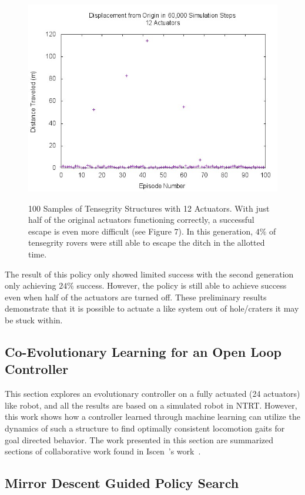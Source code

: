\begin{figure}[thpb]
\centering
{\includegraphics[width=0.8\linewidth]{tex/ARMS_2015/Pictures/dists50.jpg}} 
\caption{100 Samples of Tensegrity Structures with 12 Actuators. With just half of the original actuators functioning correctly, a successful escape is even more difficult (see Figure $7$).
In this generation, $4\%$ of tensegrity rovers were still able to escape the ditch in the allotted time.}
\label{robust12scatter}
\end{figure}

The result of this policy only showed limited success with the second generation only achieving \(24\%\) success.
However, the policy is still able to achieve success even when half of the actuators are turned off.
These preliminary results demonstrate that it is possible to actuate a \SB{} like system out of hole/craters it may be stuck within.

\subsection{Co-Evolutionary Learning for an Open Loop Controller}
\label{sec:openLoopControl}
This section explores an evolutionary controller on a fully actuated (24 actuators) \SB{} like robot, and all the results are based on a simulated robot in NTRT.
However, this work shows how a controller learned through machine learning can utilize the dynamics of such a structure to find optimally consistent locomotion gaits for goal directed behavior.
The work presented in this section are summarized sections of collaborative work found in Iscen~\etal's work~\cite{iscen2015learning}.



\subsection{Mirror Descent Guided Policy Search}
\label{sec:mdgps}

